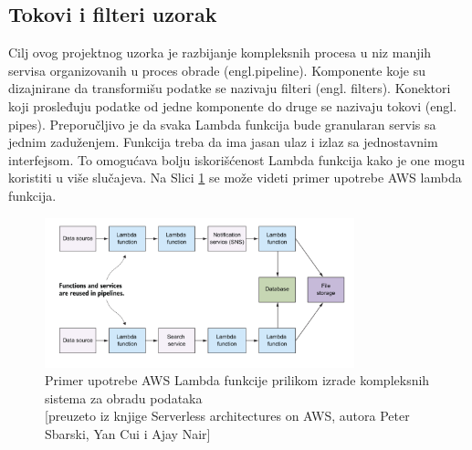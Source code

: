 \documentclass[12pt,oneside]{memoir}
\begin{document}
\subsection{Tokovi i filteri uzorak}
Cilj ovog projektnog uzorka je razbijanje kompleksnih procesa u niz manjih servisa organizovanih u proces obrade (engl.pipeline). Komponente koje su dizajnirane da transformišu podatke se nazivaju filteri (engl. filters). Konektori koji prosleđuju podatke od jedne komponente do druge se nazivaju tokovi (engl. pipes). Preporučljivo je da svaka Lambda funkcija bude granularan servis sa jednim zaduženjem. Funkcija treba da ima jasan ulaz i izlaz sa jednostavnim interfejsom. To omogućava bolju iskorišćenost Lambda funkcija kako je one mogu koristiti u više slučajeva. Na Slici \ref{fig:pipeline} se može videti primer upotrebe AWS lambda funkcija.

\begin{figure}[!ht]
  \centering
  \includegraphics[width=0.8\textwidth]{Slika 16.png}
  \caption{Primer upotrebe AWS Lambda funkcije prilikom izrade kompleksnih sistema za obradu podataka\\\footnotesize[preuzeto iz knjige Serverless architectures on AWS, autora Peter Sbarski, Yan Cui i Ajay Nair]}
  \label{fig:pipeline}
\end{figure}
\end{document}
